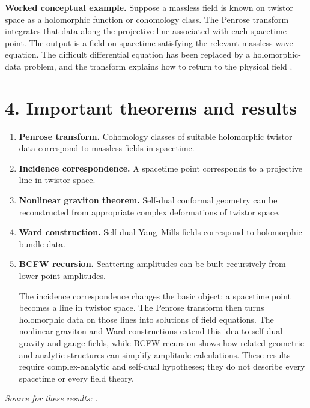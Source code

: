 \textbf{Worked conceptual example.} Suppose a massless field is known on
twistor space as a holomorphic function or cohomology class. The Penrose
transform integrates that data along the projective line associated with each
spacetime point. The output is a field on spacetime satisfying the relevant
massless wave equation. The difficult differential equation has been
replaced by a holomorphic-data problem, and the transform explains how to
return to the physical field \cite{twistor_ref3}.

\section*{4. Important theorems and results}
\begin{enumerate}[leftmargin=*,itemsep=0.35em]
\item \textbf{Penrose transform.} Cohomology classes of suitable holomorphic twistor data correspond to massless fields in spacetime.

\item \textbf{Incidence correspondence.} A spacetime point corresponds to a projective line in twistor space.

\item \textbf{Nonlinear graviton theorem.} Self-dual conformal geometry can be reconstructed from appropriate complex deformations of twistor space.

\item \textbf{Ward construction.} Self-dual Yang--Mills fields correspond to holomorphic bundle data.

\item \textbf{BCFW recursion.} Scattering amplitudes can be built recursively from lower-point amplitudes.

The incidence correspondence changes the basic object: a spacetime point becomes a line in twistor space. The Penrose transform then turns holomorphic data on those lines into solutions of field equations. The nonlinear graviton and Ward constructions extend this idea to self-dual gravity and gauge fields, while BCFW recursion shows how related geometric and analytic structures can simplify amplitude calculations. These results require complex-analytic and self-dual hypotheses; they do not describe every spacetime or every field theory.
\end{enumerate}
\noindent\emph{Source for these results:} \cite{twistor_ref1}.

